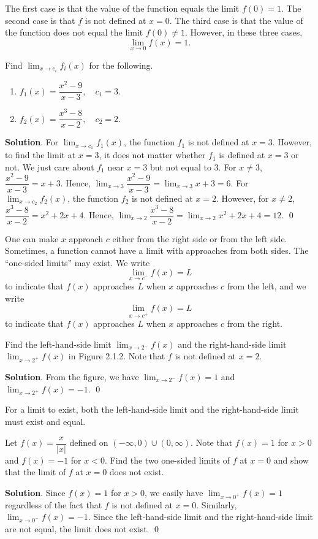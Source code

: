 \documentclass[11pt]{book}
\theoremstyle{break}
\theoremstyle{no_label}
\numberwithin{equation}{section}
\begin{document}
The first case is that the value of the function equals the limit $f(0)=1$. The second case is that $f$ is not defined at $x=0$. The third case is that the value of the function does not equal the limit $f(0)\ne 1$. However, in these three cases, $$\lim_{x\to 0}f(x)=1.$$

\begin{example}
    Find $\displaystyle\lim_{x\to c_i}f_i(x)$ for the following.
    \begin{enumerate}
        \item $f_1(x)=\dfrac{x^2-9}{x-3}, \quad c_1=3$.
        \item $f_2(x)=\dfrac{x^3-8}{x-2}, \quad c_2=2$.
    \end{enumerate}
\end{example}
\textbf{Solution}. For $\displaystyle\lim_{x\to c_1}f_1(x)$, the function $f_1$ is not defined at $x=3$. However, to find the limit at $x=3$, it does not matter whether $f_1$ is defined at $x=3$ or not. We just care about $f_1$ near $x=3$ but not equal to $3$. For $x\ne 3$, $\dfrac{x^2-9}{x-3}=x+3$. Hence, $\displaystyle\lim_{x\to 3}\dfrac{x^2-9}{x-3}=\lim_{x\to 3}x+3=6$. For $\displaystyle\lim_{x\to c_2}f_2(x)$, the function $f_2$ is not defined at $x=2$. However, for $x\ne 2$, $\dfrac{x^3-8}{x-2}=x^2+2x+4$. Hence, $\displaystyle\lim_{x\to 2}\dfrac{x^3-8}{x-2}=\lim_{x\to 2}x^2+2x+4=12$. \qed

One can make $x$ approach $c$ either from the right side or from the left side. Sometimes, a function cannot have a limit with approaches from both sides. The ``one-sided limits'' may exist. We write $$\lim_{x\to c^-}f(x)=L$$ to indicate that $f(x)$ approaches $L$ when $x$ approaches $c$ from the left, and we write $$\lim_{x\to c^+}f(x)=L$$ to indicate that $f(x)$ approaches $L$ when $x$ approaches $c$ from the right.

\begin{example}
    Find the left-hand-side limit $\displaystyle\lim_{x\to 2^-}f(x)$ and the right-hand-side limit $\displaystyle\lim_{x\to 2^+}f(x)$ in Figure 2.1.2. Note that $f$ is not defined at $x=2$.
\end{example}
\textbf{Solution}. From the figure, we have $\displaystyle\lim_{x\to 2^-}f(x)=1$ and $\displaystyle\lim_{x\to 2^+}f(x)=-1$. \qed

For a limit to exist, both the left-hand-side limit and the right-hand-side limit must exist and equal.

\begin{example}
    Let $f(x)=\dfrac{x}{|x|}$ defined on $(-\infty, 0)\cup(0, \infty)$. Note that $f(x)=1$ for $x>0$ and $f(x)=-1$ for $x<0$. Find the two one-sided limits of $f$ at $x=0$ and show that the limit of $f$ at $x=0$ does not exist.
\end{example}
\textbf{Solution}. Since $f(x)=1$ for $x>0$, we easily have $\displaystyle\lim_{x\to 0^+}f(x)=1$ regardless of the fact that $f$ is not defined at $x=0$. Similarly, $\displaystyle\lim_{x\to 0^-}f(x)=-1$. Since the left-hand-side limit and the right-hand-side limit are not equal, the limit does not exist. \qed
\end{document}
